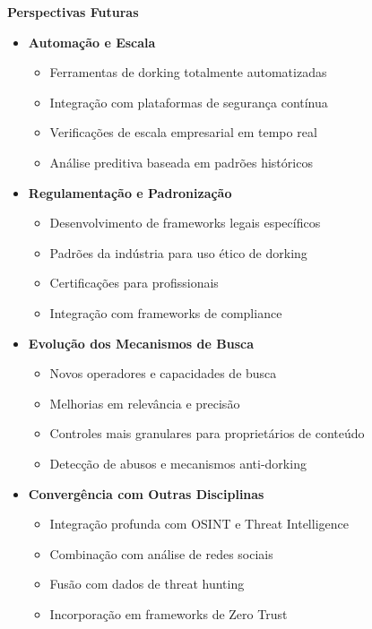 \documentclass[12pt,a4paper]{book}
\begin{document}
\begin{mdframed}[backgroundcolor=roxoconhecimento!5, roundcorner=10pt, leftmargin=1cm, rightmargin=1cm]
\begin{center}
\textbf{\large Perspectivas Futuras}
\end{center}

\begin{itemize}
    \item \textbf{Automação e Escala}
    \begin{itemize}
        \item Ferramentas de dorking totalmente automatizadas
        \item Integração com plataformas de segurança contínua
        \item Verificações de escala empresarial em tempo real
        \item Análise preditiva baseada em padrões históricos
    \end{itemize}
    
    \item \textbf{Regulamentação e Padronização}
    \begin{itemize}
        \item Desenvolvimento de frameworks legais específicos
        \item Padrões da indústria para uso ético de dorking
        \item Certificações para profissionais
        \item Integração com frameworks de compliance
    \end{itemize}
    
    \item \textbf{Evolução dos Mecanismos de Busca}
    \begin{itemize}
        \item Novos operadores e capacidades de busca
        \item Melhorias em relevância e precisão
        \item Controles mais granulares para proprietários de conteúdo
        \item Detecção de abusos e mecanismos anti-dorking
    \end{itemize}
    
    \item \textbf{Convergência com Outras Disciplinas}
    \begin{itemize}
        \item Integração profunda com OSINT e Threat Intelligence
        \item Combinação com análise de redes sociais
        \item Fusão com dados de threat hunting
        \item Incorporação em frameworks de Zero Trust
    \end{itemize}
    

\end{itemize}
\end{mdframed}
\end{document}

